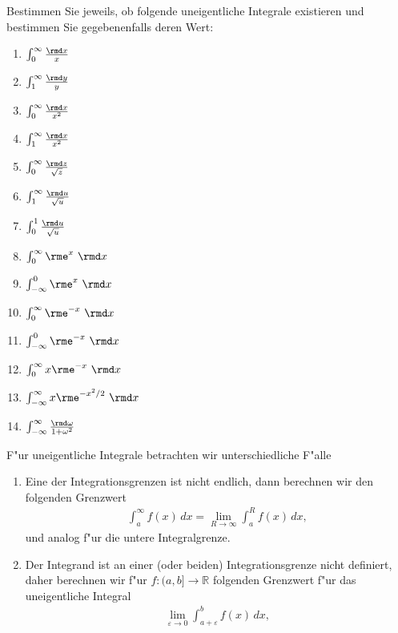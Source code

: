 \documentclass[11pt,answers]{exam}
\begin{document}
\begin{questions}

Bestimmen Sie jeweils, ob folgende uneigentliche Integrale existieren und bestimmen Sie gegebenenfalls deren Wert:\\
\parbox{0.5\textwidth}{\begin{enumerate}
\item $\int_0^\infty \frac{\rmd x}{x}$ 
\item $\int_1^\infty \frac{\rmd y}{y}$
\item $\int_0^\infty \frac{\rmd x}{x^2}$
\item $\int_1^\infty \frac{\rmd x}{x^2}$
\item $\int_0^\infty \frac{\rmd z}{\sqrt{z}}$
\item $\int_1^\infty \frac{\rmd u}{\sqrt{u}}$
\item $\int_0^1 \frac{\rmd u}{\sqrt{u}}$
\end{enumerate}}\parbox{0.5\textwidth}{\begin{enumerate}\setcounter{enumi}{7}
\item $\int_0^\infty \rme^{x}~\rmd x$
\item $\int_{-\infty}^0 \rme^{x}~\rmd x$
\item $\int_0^\infty \rme^{-x}~\rmd x$
\item $\int_{-\infty}^0 \rme^{-x}~\rmd x$
\item $\int_0^\infty x\rme^{-x}~\rmd x$
\item $\int_{-\infty}^\infty x\rme^{-x^2/2}~\rmd x$
\item $\int_{-\infty}^\infty \frac{\rmd \omega}{1+\omega^2}$ 
\end{enumerate}}
\begin{solution}F"ur uneigentliche Integrale betrachten wir unterschiedliche F"alle 
\begin{enumerate}
\item Eine der Integrationsgrenzen ist nicht endlich, dann berechnen wir den folgenden Grenzwert
\begin{align*}
\int^\infty_af(x)\,dx=\lim_{R\to\infty}\int_a^Rf(x)\,dx,
\end{align*}
und analog f"ur die untere Integralgrenze.
\item Der Integrand ist an einer (oder beiden) Integrationsgrenze nicht definiert, daher berechnen wir f"ur $f:(a,b]\to\mathbb{R}$ folgenden Grenzwert f"ur das uneigentliche Integral
\begin{align*}
\lim_{\varepsilon\to 0}\int_{a+\varepsilon}^{b}f(x)\,dx,
\end{align*}

\end{enumerate}
\end{solution}
\end{questions}
\end{document}
